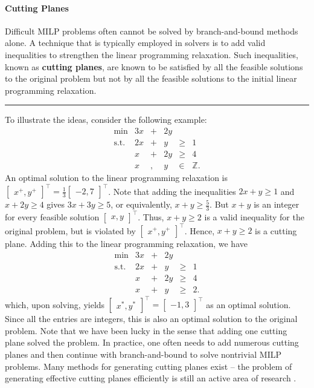 \paragraph{Cutting Planes}

Difficult MILP problems often cannot be solved by branch-and-bound
methods alone. A technique that is typically employed in solvers is to
add valid inequalities to strengthen the linear programming relaxation.
Such inequalities, known as \textbf{cutting planes}, are known to be
satisfied by all the feasible solutions to the original problem but not
by all the feasible solutions to the initial linear programming
relaxation. 
\begin{center}\rule{0.5\linewidth}{.4pt}\end{center}
To illustrate the ideas, consider the following example:
\[\begin{array}{rrcrlll}
\min & 3x & + & 2y \\
\text{s.t.} & 2x & + & y & \geq & 1 \\
 &  x & + & 2y & \geq & 4 \\
 &  x & , & y & \in & \mathbb{Z}.
\end{array}\] An optimal solution to the linear programming relaxation
is
\(\begin{bmatrix} x^+, y^+ \end{bmatrix}^{\!\top} = \frac{1}{3}\begin{bmatrix} -2,7 \end{bmatrix}^{\!\top}\).
Note that adding the inequalities \(2x + y \geq 1\) and
\(x + 2y \geq 4\) gives \(3x + 3y \geq 5\), or equivalently,
\(x + y \geq \frac{5}{3}\). But \(x+y\) is an integer for every feasible
solution \(\begin{bmatrix} x,y \end{bmatrix}^{\!\top}\). Thus,
\(x + y \geq 2\) is a valid inequality for the original problem, but is
violated by \(\begin{bmatrix} x^+, y^+ \end{bmatrix}^{\!\top}\).
Hence, \(x + y \geq 2\) is a cutting plane. Adding this to the linear
programming relaxation, we have \[\begin{array}{rrcrlll}
\min & 3x & + & 2y \\
\text{s.t.} & 2x & + & y & \geq & 1 \\
 &  x & + & 2y & \geq & 4 \\
 &  x & + & y & \geq & 2.
\end{array}\] which, upon solving, yields 
\(\begin{bmatrix} x^*,y^* \end{bmatrix}^{\!\top} = \begin{bmatrix} -1,3 \end{bmatrix}^{\!\top}\)
as an optimal solution. Since all the entries are integers, this is also
an optimal solution to the original problem. \newpage\noindent
Note that we have been lucky in the sense that adding one cutting plane solved the problem. In
practice, one often needs to add numerous cutting planes and then continue
with branch-and-bound to solve nontrivial MILP problems. Many methods for generating cutting planes exist -- the problem of generating effective cutting planes efficiently is still an active area
of research \cite{OPT_C}.
